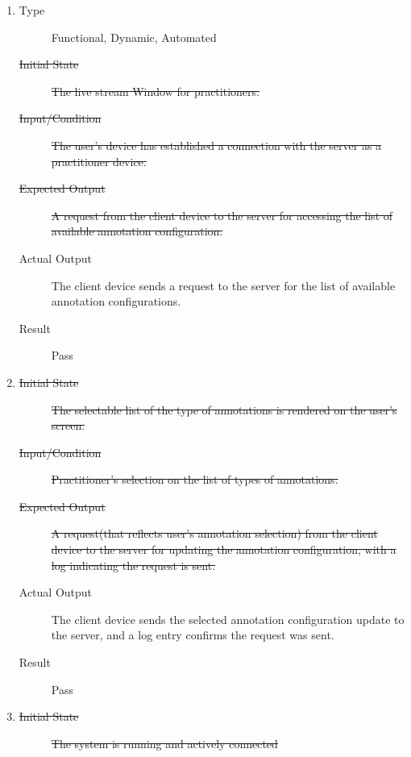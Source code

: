 \documentclass[12pt, titlepage]{article}
\begin{document}
\begin{enumerate}[FR-T1]
  \item \label{FRT4}
    \begin{description}
    \item[Type] Functional, Dynamic, Automated
    \item[\sout{Initial State}] \sout{The live stream Window for practitioners.}
		\item[\sout{Input/Condition}] \sout{The user’s device has established a
        connection with the server as a practitioner device.}
		\item[\sout{Expected Output}] \sout{A request from the client device to the server for
      accessing the list of available annotation configuration.}
		\item[Actual Output] The client device sends a request to the server for the
      list of available annotation configurations.
    \item[Result] Pass
    \end{description}
  \item \label{FRT5}
    \begin{description}
    \item[\sout{Initial State}] \sout{The selectable list of the type of
        annotations is rendered on the user's screen.}
		\item[\sout{Input/Condition}] \sout{Practitioner’s selection on the list of
        types of annotations.}
		\item[\sout{Expected Output}] \sout{A request(that reflects user’s annotation
        selection) from the client device to the server for updating the
        annotation configuration, with a log indicating the request is sent.}
		\item[Actual Output] The client device sends the selected annotation
      configuration update to the server, and a log entry confirms the request
      was sent.
    \item[Result] Pass
    \end{description}
  \item \label{FRT6}
    \begin{description}
    \item[\sout{Initial State}] \sout{The system is running and actively connected
}
\end{description}
\end{enumerate}
\end{document}
